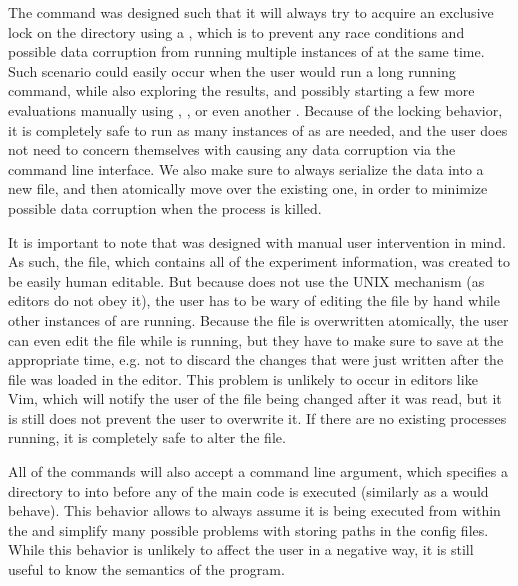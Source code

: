The \bopt command was designed such that it will always try to acquire an exclusive lock on the directory using a , which is to prevent any race conditions and possible data corruption from running multiple instances of \bopt at the same time. Such scenario could easily occur when the user would run a long running  command, while also exploring the results, and possibly starting a few more evaluations manually using , , or even another . Because of the locking behavior, it is completely safe to run as many instances of \bopt as are needed, and the user does not need to concern themselves with causing any data corruption via the command line interface. We also make sure to always serialize the data into a new file, and then atomically move over the existing one, in order to minimize possible data corruption when the \bopt process is killed.

It is important to note that \bopt was designed with manual user intervention in mind. As such, the  file, which contains all of the experiment information, was created to be easily human editable. But because \bopt does not use the UNIX  mechanism (as editors do not obey it), the user has to be wary of editing the file by hand while other instances of \bopt are running. Because the  file is overwritten atomically, the user can even edit the file while \bopt is running, but they have to make sure to save at the appropriate time, e.g. not to discard the changes that were just written after the file was loaded in the editor. This problem is unlikely to occur in editors like Vim, which will notify the user of the file being changed after it was read, but it is still does not prevent the user to overwrite it. If there are no existing \bopt processes running, it is completely safe to alter the  file.

All of the \bopt commands will also accept a  command line argument, which specifies a directory to  into before any of the main code is executed (similarly as a  would behave). This behavior allows \bopt to always assume it is being executed from within the  and simplify many possible problems with storing paths in the config files. While this behavior is unlikely to affect the user in a negative way, it is still useful to know the semantics of the program.

